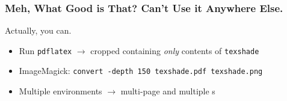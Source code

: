 \begin{frame}[fragile]
\frametitle{Meh, What Good is That? Can't Use it Anywhere Else.}
Actually, you can.

\bigskip

\pause
{}

\begin{itemize}
\item Run \texttt{pdflatex} $\rightarrow$ cropped  containing \emph{only} contents of \texttt{texshade}
\pause
\item ImageMagick: \verb|convert -depth 150 texshade.pdf texshade.png|
\pause
\item Multiple environments $\rightarrow$ multi-page  and multiple s
\end{itemize}
\end{frame}

